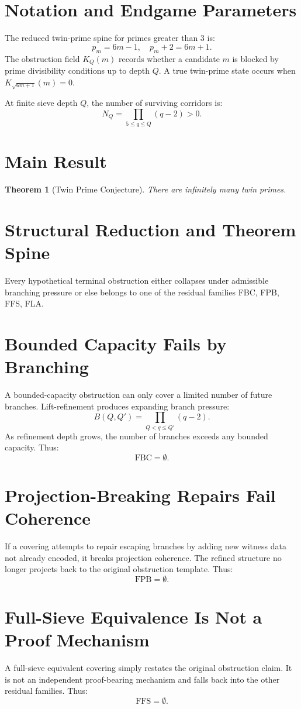 \documentclass[11pt,a4paper]{article}
\newtheorem{theorem}{Theorem}
\begin{document}
\section{Notation and Endgame Parameters}
The reduced twin-prime spine for primes greater than 3 is:
\[
p_m = 6m - 1, \quad p_m + 2 = 6m + 1.
\]
The obstruction field \(K_Q(m)\) records whether a candidate \(m\) is blocked by prime divisibility conditions up to depth \(Q\). A true twin-prime state occurs when \(K_{\sqrt{6m+1}}(m) = 0\).

At finite sieve depth \(Q\), the number of surviving corridors is:
\[
N_Q = \prod_{5 \le q \le Q} (q - 2) > 0.
\]

\section{Main Result}
\begin{theorem}[Twin Prime Conjecture]
There are infinitely many twin primes.
\end{theorem}

\section{Structural Reduction and Theorem Spine}
Every hypothetical terminal obstruction either collapses under admissible branching pressure or else belongs to one of the residual families FBC, FPB, FFS, FLA.

\section{Bounded Capacity Fails by Branching}
A bounded-capacity obstruction can only cover a limited number of future branches. Lift-refinement produces expanding branch pressure:
\[
B(Q, Q') = \prod_{Q < q \le Q'} (q - 2).
\]
As refinement depth grows, the number of branches exceeds any bounded capacity. Thus:
\[
\mathrm{FBC} = \emptyset.
\]

\section{Projection-Breaking Repairs Fail Coherence}
If a covering attempts to repair escaping branches by adding new witness data not already encoded, it breaks projection coherence. The refined structure no longer projects back to the original obstruction template. Thus:
\[
\mathrm{FPB} = \emptyset.
\]

\section{Full-Sieve Equivalence Is Not a Proof Mechanism}
A full-sieve equivalent covering simply restates the original obstruction claim. It is not an independent proof-bearing mechanism and falls back into the other residual families. Thus:
\[
\mathrm{FFS} = \emptyset.
\]
\end{document}
